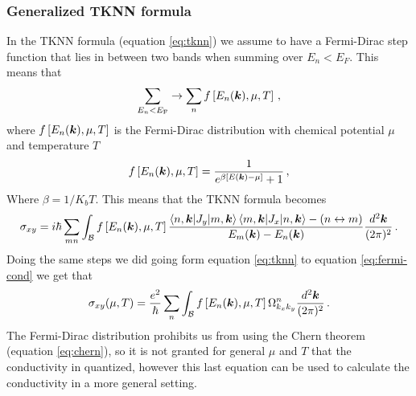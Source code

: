 \subsubsection*{Generalized TKNN formula}
In the TKNN formula (equation \ref{eq:tknn}) we assume to have a Fermi-Dirac step function that lies in between two bands when summing over $E_n< E_F$. This means that
\begin{equation}
    \sum_{E_n<E_\textrm{F}}\to 
    \sum_{n}f\left[E_n(\boldsymbol{k}),\mu,T\right]\,,
\end{equation}
where $f\left[E_n(\boldsymbol{k}),\mu,T\right]$ is the Fermi-Dirac distribution with chemical potential $\mu$ and temperature $T$
\begin{equation}
    f\left[E_n(\boldsymbol{k}),\mu,T\right]=
    \frac 1 {e^{\beta[E(\boldsymbol{k})-\mu]}+1}\,,
\end{equation}
Where $\beta=1/K_bT$. This means that the TKNN formula becomes 
\begin{equation}
    \sigma_{xy}=i\hbar\sum_{mn}\int_{\mathcal B}f\left[E_n(\boldsymbol{k}),\mu,T\right]
    \frac{
        \braket{n,\boldsymbol{k}|J_y}{m,\boldsymbol{k}}\braket{m,\boldsymbol{k}|J_x}{n,\boldsymbol{k}} - (n\leftrightarrow m)
    }
    {
        E_m(\boldsymbol{k})-E_n(\boldsymbol{k})
    }
    \frac{d^2\boldsymbol{k}}{(2\pi)^2}\,.
    \label{eq:tknn-gener}
\end{equation}
Doing the same steps we did going form equation \ref{eq:tknn} to equation \ref{eq:fermi-cond} we get that 
\begin{equation}
    \sigma_{xy}(\mu,T)=\frac{e^2}\hbar \sum_{n}\int_{\mathcal B}f\left[E_n(\boldsymbol{k}),\mu,T\right]\Omega^n_{k_xk_y}\frac {d^2\boldsymbol{k}}{(2\pi)^2}\,.
    \label{eq:fermi-cond-2}
\end{equation}
The Fermi-Dirac distribution prohibits us from using the Chern theorem (equation \ref{eq:chern}), so it is not granted for general $\mu$ and $T$ that the conductivity in quantized, however this last equation can be used to calculate the conductivity in a more general setting.














